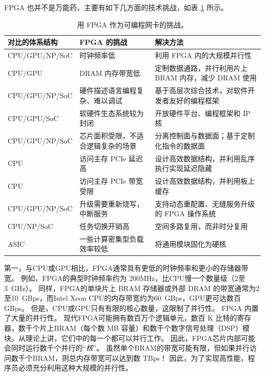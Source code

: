 
FPGA 也并不是万能药，主要有如下几方面的技术挑战，如表 \ref{background:tab:fpga-challenges} 所示。

\begin{table}[htbp]
	\centering
	\caption{用 FPGA 作为可编程网卡的挑战。}
	\small
	\begin{tabular}{l|p{}|p{}}
		\hline
		对比的体系结构 & FPGA 的挑战 & 解决方法 \\
		\hline
		\hline
		CPU/GPU/NP/SoC & 时钟频率低 & 利用 FPGA 内的大规模并行性 \\
		\hline 
		CPU/GPU & DRAM 内存带宽低 & 定制数据通路，并行利用片上 BRAM 内存，减少 DRAM 使用 \\
		\hline
		CPU/GPU/NP/SoC & 硬件描述语言编程复杂、难以调试 & 基于高层次综合技术，对软件开发者友好的编程框架 \\
		\hline
		CPU/GPU/SoC & 软硬件生态系统较为封闭 & 开放硬件平台、编程框架和 IP 核 \\
		\hline
		CPU/GPU/NP/SoC & 芯片面积受限，不适合逻辑复杂的场景 & 分离控制面与数据面；基于定制化指令的数据面 \\
		\hline
		CPU & 访问主存 PCIe 延迟高 & 设计高效数据结构，并利用乱序执行实现延迟隐藏 \\
		\hline
		CPU & 访问主存 PCIe 带宽受限 & 设计高效数据结构，并利用板上缓存 \\
		\hline
		CPU/GPU/NP/SoC & 升级需要重新烧写，中断服务 & 支持动态重配置、无缝服务升级的 FPGA 操作系统 \\
		\hline
		CPU/NP/SoC & 任务切换开销高 & 空间多路复用，而非时分复用 \\
		\hline
		ASIC & 一些计算密集型负载效率较低 & 将通用模块固化为硬核 \\
		\hline
	\end{tabular}
	\label{background:tab:fpga-challenges}
\end{table}


第一，与CPU或GPU相比，FPGA通常具有更低的时钟频率和更小的存储器带宽。
例如，FPGA的典型时钟频率约为 200MHz，比CPU慢一个数量级（2至3~GHz）。
同样，FPGA的单块片上 BRAM 存储器或外部 DRAM 的带宽通常为2至10~GBps，而Intel Xeon CPU的内存带宽约为60~GBps，GPU更可达数百 GBps。
但是，CPU或GPU只有有限的核心数量，这限制了并行性。
FPGA 内置了大量的并行性。
现代FPGA可能拥有数百万个逻辑单元，数百 K 比特的寄存器，数千个片上BRAM（每个数 MB 容量）和数千个数字信号处理（DSP）模块。从理论上讲，它们中的每一个都可以并行工作。
因此，FPGA芯片内部可能会同时运行数千个并行的``\textit {核}''。
虽然单个BRAM的带宽可能有限，但如果并行访问数千个BRAM，则总内存带宽可以达到数 TBps！
因此，为了实现高性能，程序员必须充分利用这种大规模的并行性。

